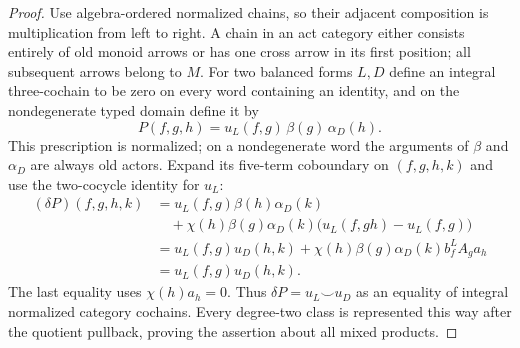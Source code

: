 \begin{proof}
Use algebra-ordered normalized chains, so their adjacent
composition is multiplication from left to right.  A chain in
an act category either consists entirely of old monoid arrows
or has one cross arrow in its first position; all subsequent
arrows belong to $M$.  For two balanced forms $L,D$ define an
integral three-cochain to be zero on every word containing an
identity, and on the nondegenerate typed domain define it by
\[
 P(f,g,h)=u_L(f,g)\,\beta(g)\,\alpha_D(h).
\]
This prescription is normalized; on a nondegenerate word the
arguments of $\beta$ and $\alpha_D$ are always old actors.
Expand its five-term coboundary on
$(f,g,h,k)$ and use the two-cocycle identity for $u_L$:
\begin{align*}
 (\delta P)(f,g,h,k)
 &=u_L(f,g)\beta(h)\alpha_D(k)\\
 &\quad+\chi(h)\beta(g)\alpha_D(k)
       \bigl(u_L(f,gh)-u_L(f,g)\bigr)\\
 &=u_L(f,g)u_D(h,k)
   +\chi(h)\beta(g)\alpha_D(k)b^L_f A_g a_h\\
 &=u_L(f,g)u_D(h,k).
\end{align*}
The last equality uses $\chi(h)a_h=0$.
Thus $\delta P=u_L\smile u_D$ as an equality of integral
normalized category cochains.  Every degree-two class is
represented this way after the quotient pullback, proving the
assertion about all mixed products.
\end{proof}

